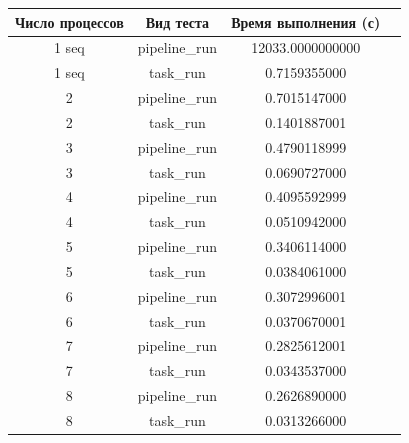 \documentclass{article}
\begin{document}
\centering
\begin{tabular}{|c|c|c|c|}
    \hline
    Число процессов & Вид теста      & Время выполнения (с)  \\ \hline
    1 seq             & pipeline\_run & 12033.0000000000                    \\ \hline
    1 seq             & task\_run     & 0.7159355000                    \\ \hline
    2               & pipeline\_run & 0.7015147000                     \\ \hline
    2               & task\_run     & 0.1401887001                    \\ \hline
    3               & pipeline\_run & 0.4790118999                    \\ \hline
    3               & task\_run     & 0.0690727000                   \\ \hline
    4               & pipeline\_run & 0.4095592999                   \\ \hline
    4               & task\_run     & 0.0510942000                      \\ \hline
    5              & pipeline\_run & 0.3406114000                    \\ \hline
    5              & task\_run     & 0.0384061000                  \\ \hline
    6              & pipeline\_run & 0.3072996001                  \\ \hline
    6              & task\_run     & 0.0370670001                     \\ \hline
    7              & pipeline\_run & 0.2825612001                  \\ \hline
    7              & task\_run     & 0.0343537000                      \\ \hline
    8              & pipeline\_run & 0.2626890000                      \\ \hline
    8            & task\_run     & 0.0313266000                   \\ \hline
\end{tabular}
 \vspace{1.0cm}
\end{document}
